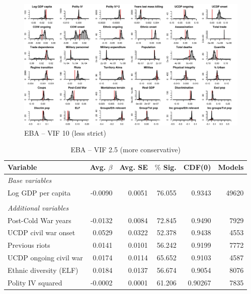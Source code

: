 \clearpage
\begin{figure}
    \centering
    \includegraphics[width=\textwidth]{images/mk-high-vif.pdf}
    \caption{EBA -- VIF 10 (less strict)}
    \label{fig:hist-mk-high-vif}
\end{figure}
\clearpage

\vspace{1cm}

\begin{table}[H]
\centering
\begin{tabular}{lrrrrr}
\hline
\textbf{Variable} & \textbf{Avg. $\beta$} & \textbf{Avg. SE} & \textbf{$\%$ Sig.} & \textbf{CDF(0)} & \textbf{Models} \\ \hline
\textit{Base variables} &  &  &  &  &  \\
Log GDP per capita & -0.0090 & 0.0051 & 76.055 & 0.9343 & 49620 \\
 &  &  &  &  &  \\
\textit{Additional variables} &  &  &  &  &  \\
Post-Cold War years & -0.0132 & 0.0084 & 72.845 & 0.9490 & 7929 \\
UCDP civil war onset & 0.0529 & 0.0322 & 52.378 & 0.9438 & 4553 \\
Previous riots & 0.0141 & 0.0101 & 56.242 & 0.9199 & 7772 \\
UCDP ongoing civil war & 0.0174 & 0.0114 & 65.652 & 0.9103 & 4587 \\
Ethnic diversity (ELF) & 0.0184 & 0.0137 & 56.674 & 0.9054 & 8076 \\
Polity IV squared & -0.0002 & 0.0001 & 61.206 & 0.90267 & 7835 \\ \hline
\end{tabular}
\caption{EBA -- VIF 2.5 (more conservative)}
\label{tab:eba1}
\end{table}

